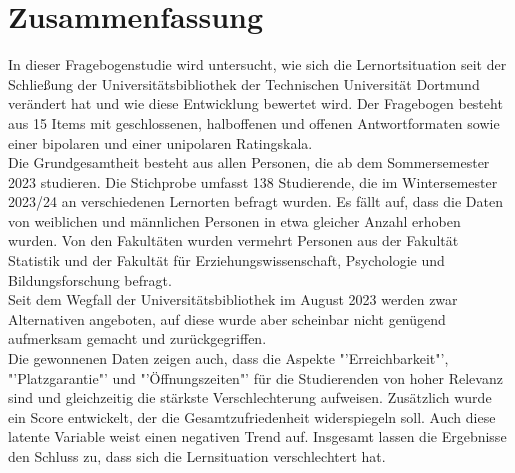 \documentclass[11pt, a4paper]{article}
\begin{document}
\section*{Zusammenfassung}
In dieser Fragebogenstudie wird untersucht, wie sich die Lernortsituation seit der Schließung der Universitätsbibliothek der Technischen Universität Dortmund verändert hat und wie diese Entwicklung bewertet wird.
Der Fragebogen besteht aus 15 Items mit geschlossenen, halboffenen und offenen Antwortformaten sowie einer bipolaren und einer unipolaren Ratingskala. \\
Die Grundgesamtheit besteht aus allen Personen, die ab dem Sommersemester 2023 studieren. Die Stichprobe umfasst 138 Studierende, die im Wintersemester 2023/24 an verschiedenen Lernorten befragt wurden.
Es fällt auf, dass die Daten von weiblichen und männlichen Personen in etwa gleicher Anzahl erhoben wurden. Von den Fakultäten wurden vermehrt Personen aus der Fakultät Statistik und der Fakultät für Erziehungswissenschaft, Psychologie und Bildungsforschung befragt.\\
Seit dem Wegfall der Universitätsbibliothek im August 2023 werden zwar Alternativen angeboten, auf diese wurde aber scheinbar nicht genügend aufmerksam gemacht und zurückgegriffen.\\
Die gewonnenen Daten zeigen auch, dass die Aspekte "'Erreichbarkeit"', "'Platzgarantie"' und "'Öffnungszeiten"' für die Studierenden von hoher Relevanz sind und gleichzeitig die stärkste Verschlechterung aufweisen. Zusätzlich wurde ein Score entwickelt, der die Gesamtzufriedenheit widerspiegeln soll. Auch diese latente Variable weist einen negativen Trend auf.
Insgesamt lassen die Ergebnisse den Schluss zu, dass sich die Lernsituation verschlechtert hat.\\

\newpage\null\thispagestyle{empty}\newpage

\newpage
\cleardoublepage%
\end{document}
